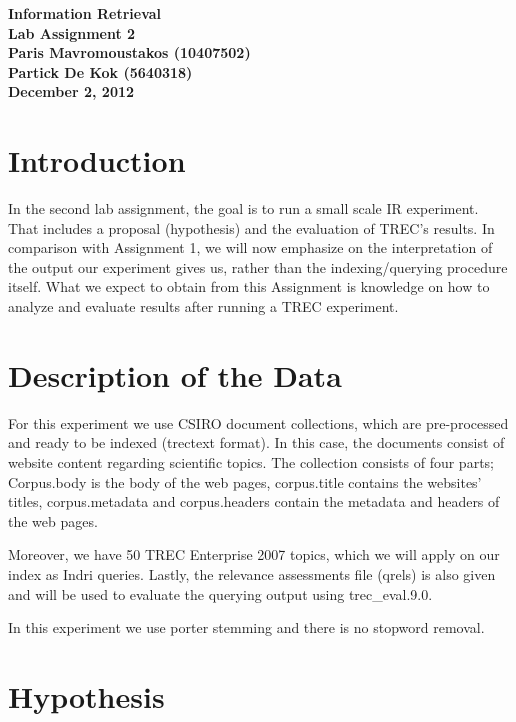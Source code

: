 \documentclass[letterpaper,11pt]{article}
\begin{document}
\begin{center}
\Huge \textbf{Information Retrieval}\\ \vspace{0.4cm}
\huge \textbf{Lab Assignment 2}\\ \vspace{0.4cm}
\LARGE \textbf{Paris Mavromoustakos (10407502)}\\
\LARGE \textbf{Partick De Kok (5640318)}\\ \vspace{0.4cm}
\textbf{ December 2, 2012}
\end{center}


\section{Introduction}
In the second lab assignment, the goal is to run a small scale IR experiment. That includes a proposal (hypothesis) and the evaluation of TREC's results. In comparison with Assignment 1, we will now emphasize on the interpretation of the output our experiment gives us, rather than the indexing/querying procedure itself. What we expect to obtain from this Assignment is knowledge on how to analyze and evaluate results after running a TREC experiment.


\section{Description of the Data }

For this experiment we use CSIRO document collections, which are pre-processed and ready to be indexed (trectext format). In this case, the documents consist of website content regarding scientific topics. The collection consists of four parts; Corpus.body is the body of the web pages, corpus.title contains the websites' titles, corpus.metadata and corpus.headers contain the metadata and headers of the web pages. 

Moreover, we have 50 TREC Enterprise 2007 topics, which we will apply on our index as Indri queries. Lastly, the relevance assessments file (qrels) is also given and will be used to evaluate the querying output using trec\_eval.9.0.

In this experiment we use porter stemming and there is no stopword removal.



\section{Hypothesis}
\end{document}
